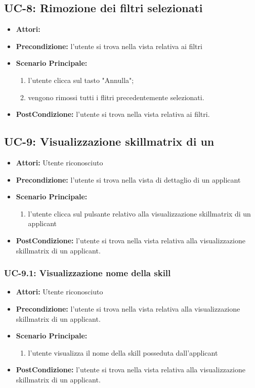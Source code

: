 \subsection{UC-8: Rimozione dei filtri selezionati}
\begin{itemize}
\item \textbf{Attori:}\loggedusr
\item \textbf{Precondizione:} l'utente si trova nella vista relativa ai filtri
\item \textbf{Scenario Principale:}
\begin{enumerate}
	\item l'utente clicca sul tasto "Annulla";
	\item vengono rimossi tutti i flitri precedentemente selezionati.
\end{enumerate}
\item \textbf{PostCondizione:} l'utente si trova nella vista relativa ai filtri.
\end{itemize}

\subsection{UC-9: Visualizzazione skillmatrix di un \applicant}
\begin{itemize}
\item \textbf{Attori:} Utente riconosciuto
\item \textbf{Precondizione:}  l'utente si trova nella vista di dettaglio di un applicant
\item \textbf{Scenario Principale:}
\begin{enumerate}
	\item l'utente clicca sul pulsante relativo alla visualizzazione skillmatrix di un applicant
\end{enumerate}
\item \textbf{PostCondizione:} l'utente si trova nella vista relativa alla visualizzazione skillmatrix di un applicant.
\end{itemize}

\subsubsection{UC-9.1: Visualizzazione nome della skill}
\begin{itemize}
\item \textbf{Attori:} Utente riconosciuto
\item \textbf{Precondizione:}  l'utente si trova nella vista relativa alla visualizzazione skillmatrix di un applicant.
\item \textbf{Scenario Principale:}
\begin{enumerate}
	\item l'utente visualizza il nome della skill posseduta dall'applicant
\end{enumerate}
\item \textbf{PostCondizione:}  l'utente si trova nella vista relativa alla visualizzazione skillmatrix di un applicant.
\end{itemize}


